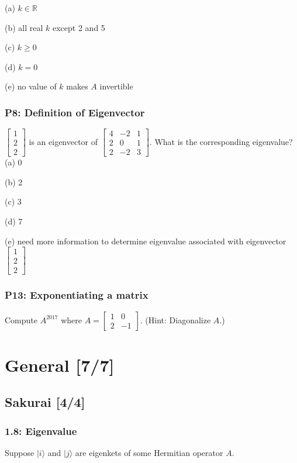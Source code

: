 \documentclass[11pt]{article}
\begin{document}
(a) \(k \in \mathbb{R}\)

(b) all real \(k\) except 2 and 5

(c) \(k \geq 0\)

(d) \(k=0\)

(e) no value of \(k\) makes \(A\) invertible
\subsubsection{P8: Definition of Eigenvector}
\label{sec:org56b51a6}
 \(\left[\begin{array}{l}1 \\ 2 \\ 2\end{array}\right]\) is an eigenvector of
   \(\left[\begin{array}{rrr}4 & -2 & 1 \\ 2 & 0 & 1 \\ 2 & -2 &
   3\end{array}\right]\). What is the corresponding eigenvalue?
(a) 0

(b) 2

(c) 3

(d) 7

(e) need more information to determine eigenvalue associated with eigenvector
\(\left[\begin{array}{l}1 \\ 2 \\ 2\end{array}\right]\)
\subsubsection{P13: Exponentiating a matrix}
\label{sec:org43ee49c}
Compute \(A^{2017}\) where \(A=\left[\begin{array}{rr}1 & 0 \\ 2 &
    -1\end{array}\right]\). (Hint: Diagonalize \(A\).)
\section{General [7/7]}
\label{sec:org68d8c3e}
\subsection{Sakurai [4/4]}
\label{sec:org4f9dcd3}
\subsubsection{1.8: Eigenvalue}
\label{sec:org7465ce3}
Suppose \(|i\rangle\) and \(|j\rangle\) are eigenkets of some Hermitian operator
\(A\).
\end{document}
